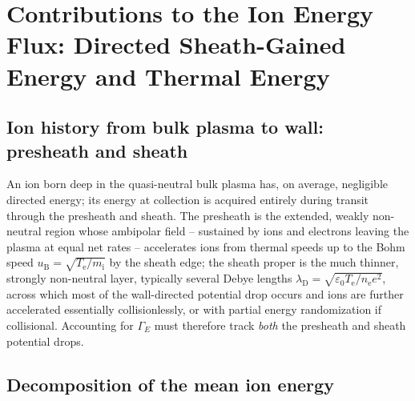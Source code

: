 \section{Contributions to the Ion Energy Flux: Directed Sheath-Gained Energy and Thermal Energy}
\label{sec:contributions}

\subsection{Ion history from bulk plasma to wall: presheath and sheath}

An ion born deep in the quasi-neutral bulk plasma has, on average, negligible directed energy; its energy at collection is acquired entirely during transit through the presheath and sheath. The presheath is the extended, weakly non-neutral region whose ambipolar field -- sustained by ions and electrons leaving the plasma at equal net rates -- accelerates ions from thermal speeds up to the Bohm speed $u_{\mathrm{B}} = \sqrt{T_{\mathrm{e}}/m_{\mathrm{i}}}$ by the sheath edge; the sheath proper is the much thinner, strongly non-neutral layer, typically several Debye lengths $\lambda_{\mathrm{D}} = \sqrt{\varepsilon_0 T_{\mathrm{e}}/n_{\mathrm{e}} e^2}$, across which most of the wall-directed potential drop occurs and ions are further accelerated essentially collisionlessly, or with partial energy randomization if collisional. Accounting for $\Gamma_{E}$ must therefore track \emph{both} the presheath and sheath potential drops.

\subsection{Decomposition of the mean ion energy}

